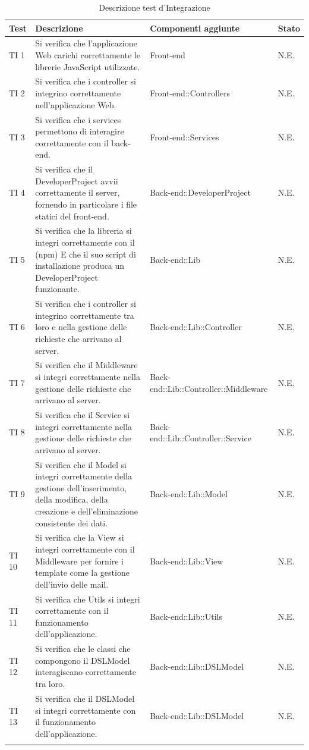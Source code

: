 	\bgroup
	\begin{longtable}[H]{|P{1cm}|P{5cm}|P{4.5cm}|P{2cm}|}
		\hline \textbf{Test} & \textbf{Descrizione} & \textbf{Componenti aggiunte} & \textbf{Stato} \\
		
		\hline TI 1 & Si verifica che l'applicazione Web carichi correttamente le librerie JavaScript utilizzate. & Front-end & N.E. \\
		\hline TI 2 & Si verifica che i controller si integrino correttamente nell'applicazione Web. & Front-end::Controllers & N.E. \\
		\hline TI 3 & Si verifica che i services permettono di interagire correttamente con il back-end. & Front-end::Services & N.E. \\
		\hline TI 4 & Si verifica che il DeveloperProject avvii correttamente il server, fornendo in particolare i file statici del front-end. & Back-end::DeveloperProject & N.E. \\
		\hline TI 5 & Si verifica che la libreria si integri correttamente con il  (npm) E che il suo script di installazione produca un DeveloperProject funzionante. & Back-end::Lib & N.E. \\
		\hline TI 6 & Si verifica che i controller si integrino correttamente tra loro e nella gestione delle richieste che arrivano al server. & Back-end::Lib::Controller & N.E. \\
		\hline TI 7 & Si verifica che il Middleware si integri correttamente nella gestione delle richieste che arrivano al server. & Back-end::Lib::Controller::Middleware & N.E. \\
		\hline TI 8 & Si verifica che il Service si integri correttamente nella gestione delle richieste che arrivano al server. & Back-end::Lib::Controller::Service & N.E. \\
		\hline TI 9 & Si verifica che il Model si integri correttamente della gestione dell'inserimento, della modifica, della creazione e dell'eliminazione consistente dei dati. & Back-end::Lib::Model & N.E. \\
		\hline TI 10 & Si verifica che la View si integri correttamente con il Middleware per fornire i template come la gestione dell'invio delle mail. & Back-end::Lib::View & N.E. \\
		\hline TI 11 & Si verifica che Utils si integri correttamente con il funzionamento dell'applicazione. & Back-end::Lib::Utils & N.E. \\
		\hline TI 12 & Si verifica che le classi che compongono il DSLModel interagiscano correttamente tra loro. & Back-end::Lib::DSLModel & N.E. \\
		\hline TI 13 & Si verifica che il DSLModel si integri correttamente con il funzionamento dell'applicazione. & Back-end::Lib::DSLModel & N.E. \\
		\hline

	\caption{Descrizione test d'Integrazione}
	\end{longtable}
	\egroup


